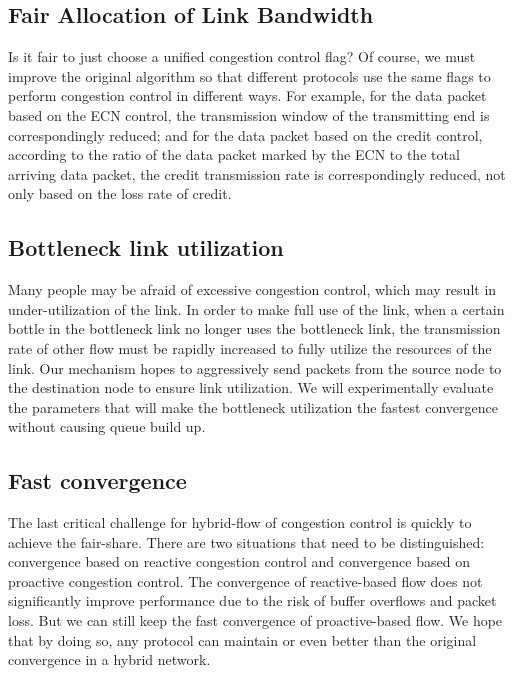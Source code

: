 \documentclass[conference]{IEEEtran}
\begin{document}
\subsection{Fair Allocation of Link Bandwidth}



Is it fair to just choose a unified congestion control flag? Of course, we must improve the original algorithm so that different protocols use the same flags to perform congestion control in different ways. For example, for the data packet based on the ECN control, the transmission window of the transmitting end is correspondingly reduced; and for the data packet based on the credit control, according to the ratio of the data packet marked by the ECN to the total arriving data packet, the credit transmission rate is correspondingly reduced, not only based on the loss rate of credit.





\subsection{Bottleneck link utilization}

Many people may be afraid of excessive congestion control, which may result in under-utilization of the link. In order to make full use of the link, when a certain bottle in the bottleneck link no longer uses the bottleneck link, the transmission rate of other flow must be rapidly increased to fully utilize the resources of the link. Our mechanism hopes to aggressively send packets from the source node to the destination node to ensure link utilization. We will experimentally evaluate the parameters that will make the bottleneck utilization the fastest convergence without causing queue build up.



\subsection{Fast convergence}



The last critical challenge for hybrid-flow of congestion control is quickly to achieve the fair-share. There are two situations that need to be distinguished: convergence based on reactive congestion control and convergence based on proactive congestion control. The convergence of reactive-based flow does not significantly improve performance due to the risk of buffer overflows and packet loss. But we can still keep the fast convergence of proactive-based flow. We hope that by doing so, any protocol can maintain or even better than the original convergence in a hybrid network.
\end{document}
